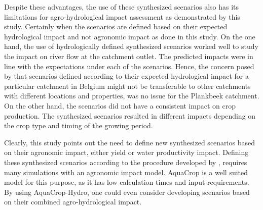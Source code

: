 Despite these advantages, the use of these synthesized scenarios also has its limitations for agro-hydrological impact assessment as demonstrated by this study. Certainly when the scenarios are defined based on their expected hydrological impact and not agronomic impact as done in this study.  On the one hand, the use of hydrologically defined synthesized scenarios worked well to study the impact on river flow at the catchment outlet. The predicted impacts were in line with the expectations under each of the scenarios. Hence, the concern posed by \textcite{ntegeka2014} that scenarios defined according to their expected hydrological impact for a particular catchment in Belgium might not be transferable to other catchments with different locations and properties, was no issue for the Plankbeek catchment. On the other hand, the scenarios did not have a consistent impact on crop production. The synthesized scenarios resulted in different impacts depending on the crop type and timing of the growing period. 

Clearly, this study points out the need to define new synthesized scenarios based on their agronomic impact, either yield or water productivity impact. Defining these synthesized scenarios according to the procedure developed by \textcite{ntegeka2014}, requires many simulations with an agronomic impact model. AquaCrop is a well suited model for this purpose, as it has low calculation times and input requirements. By using AquaCrop-Hydro, one could even consider developing scenarios based on their combined agro-hydrological impact. 

